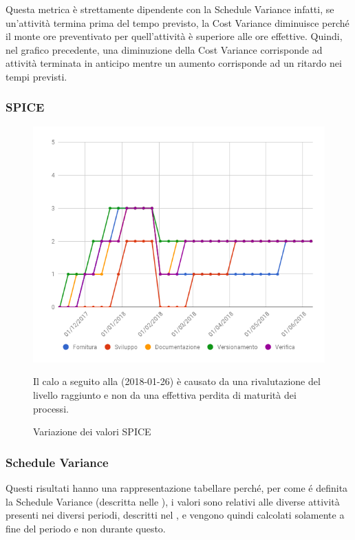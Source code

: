 		Questa metrica è strettamente dipendente con la Schedule Variance infatti,  
		se un'attività termina prima del tempo previsto, la Cost Variance diminuisce
		perché il monte ore preventivato per quell'attività è superiore alle ore 
		effettive. Quindi, nel grafico precedente, una diminuzione della Cost Variance
		corrisponde ad attività terminata in anticipo mentre un aumento corrisponde
		ad un ritardo nei tempi previsti.\\
				
		\subsubsection{SPICE}
		\begin{figure}[H]{\textwidth}
			\centering
			\includegraphics[width=1\linewidth]{./img/Risultati/SPICE.png}
			{\footnotesize Il calo a seguito alla \RR{}(2018-01-26) 
			è causato da una rivalutazione del livello raggiunto e non
			da una effettiva perdita di maturità dei processi.
			\par}
			\caption{Variazione dei valori SPICE}
		\end{figure}

\newpage
		
		\subsubsection{Schedule Variance}
			Questi risultati hanno una rappresentazione tabellare perché, per come
			é definita la Schedule Variance (descritta nelle \vNormeDiProgetto{}), i valori 
			sono relativi alle diverse attività presenti nei diversi periodi, descritti nel
			\vPianoDiProgetto{}, e vengono quindi calcolati solamente a fine del periodo e non 
			durante questo.		
		
